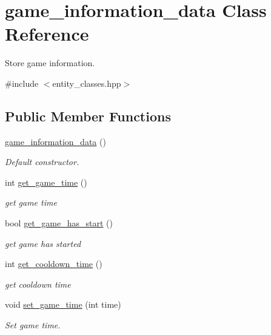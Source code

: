 \hypertarget{classgame__information__data}{}\section{game\+\_\+information\+\_\+data Class Reference}
\label{classgame__information__data}


Store game information.  




{\ttfamily \#include $<$entity\+\_\+classes.\+hpp$>$}

\subsection*{Public Member Functions}
\begin{DoxyCompactItemize}
\item 
\hyperlink{classgame__information__data_adf5e84fd74e3e18b71b4acdc74de6844}{game\+\_\+information\+\_\+data} ()
\begin{DoxyCompactList}\small\item\em Default constructor. \end{DoxyCompactList}\item 
int \hyperlink{classgame__information__data_ad63a9f9e72242aa68cef64d53ce52249}{get\+\_\+game\+\_\+time} ()
\begin{DoxyCompactList}\small\item\em get game time \end{DoxyCompactList}\item 
bool \hyperlink{classgame__information__data_a513ec296585aedfedfd917528f9f8fe6}{get\+\_\+game\+\_\+has\+\_\+start} ()
\begin{DoxyCompactList}\small\item\em get game has started \end{DoxyCompactList}\item 
int \hyperlink{classgame__information__data_a534bcb8f2bec244ec6ab3eb200f4e301}{get\+\_\+cooldown\+\_\+time} ()
\begin{DoxyCompactList}\small\item\em get cooldown time \end{DoxyCompactList}\item 
void \hyperlink{classgame__information__data_a641a08d61da5a638cb7fe78b9c71cb11}{set\+\_\+game\+\_\+time} (int time)
\begin{DoxyCompactList}\small\item\em Set game time. \end{DoxyCompactList}\item 

\end{DoxyCompactItemize}
